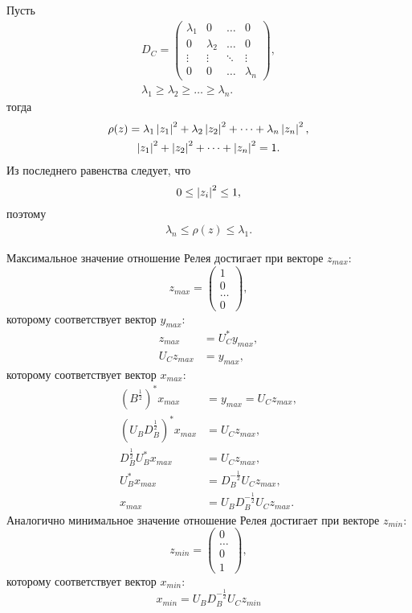 Пусть
\begin{gather*}
    D_C
    = \begin{pmatrix}
          \lambda_1 & 0         & \dots  & 0         \\
          0         & \lambda_2 & \dots  & 0         \\
          \vdots    & \vdots    & \ddots & \vdots    \\
          0         & 0         & \dots  & \lambda_n
    \end{pmatrix} , \\
    \lambda_1 \ge \lambda_2 \ge \dots \ge \lambda_n.
\end{gather*}
тогда
\begin{gather*}
    \rho(z)
    = \lambda_1 \left | z_1 \right |^2 + \lambda_2 \left | z_2 \right |^2 + \dots + \lambda_n \left | z_n \right |^2, \\
    \left | z_1 \right |^2 + \left | z_2 \right |^2 + \dots + \left | z_n \right |^2 = 1.
\end{gather*}
Из последнего равенства следует, что
\[
    0 \le \left | z_i \right |^2 \le 1 ,
\]
поэтому
\begin{gather*}
    \lambda_n \le \rho(z) \le \lambda_1 .
\end{gather*}

Максимальное значение отношение Релея достигает при векторе $z_{max}$:
\[
    z_{max}
    = \begin{pmatrix}
          1     \\
          0     \\
          \dots \\
          0
    \end{pmatrix} ,
\]
которому соответствует вектор $y_{max}$:
\begin{align*}
    z_{max} & = U_C^* y_{max} , \\
    U_C z_{max} & = y_{max} ,
\end{align*}
которому соответствует вектор $x_{max}$:
\begin{align*}
    \left ( B^\frac{1}{2} \right )^* x_{max} & = y_{max} = U_C z_{max} , \\
    \left ( U_B D_B^\frac{1}{2} \right )^* x_{max} & = U_C z_{max} , \\
    D_B^\frac{1}{2} U_B^* x_{max} & = U_C z_{max} , \\
    U_B^* x_{max} & = D_B^{-\frac{1}{2}} U_C z_{max} , \\
    x_{max} & = U_B D_B^{-\frac{1}{2}} U_C z_{max} .
\end{align*}
Аналогично минимальное значение отношение Релея достигает при векторе $z_{min}$:
\[
    z_{min}
    = \begin{pmatrix}
          0     \\
          \dots \\
          0     \\
          1
    \end{pmatrix} ,
\]
которому соответствует вектор $x_{min}$:
\[
    x_{min} = U_B D_B^{-\frac{1}{2}} U_C z_{min}
\]